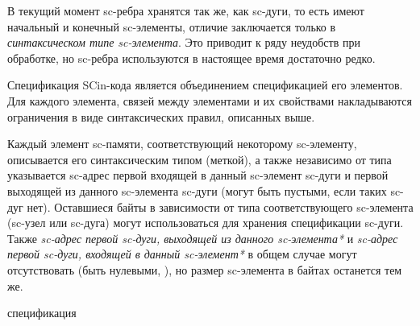 В текущий момент sc-ребра хранятся так же, как sc-дуги, то есть имеют начальный и конечный sc-элементы, отличие заключается только в \textit{синтаксическом типе sc-элемента}. Это приводит к ряду неудобств при обработке, но sc-ребра используются в настоящее время достаточно редко.

Спецификация SCin-кода является объединением спецификацией его элементов. Для каждого элемента, связей между элементами и их свойствами накладываются ограничения в виде синтаксических правил, описанных выше.

\begin{SCn}
\begin{scnindent}
\end{scnindent}
\end{SCn}

Каждый элемент sc-памяти, соответствующий некоторому sc-элементу, описывается его синтаксическим типом (меткой), а также независимо от типа указывается sc-адрес первой входящей в данный sc-элемент sc-дуги и первой выходящей из данного sc-элемента sc-дуги (могут быть пустыми, если таких sc-дуг нет). Оставшиеся байты в зависимости от типа соответствующего sc-элемента (sc-узел или sc-дуга) могут использоваться для хранения спецификации sc-дуги. Также \textit{sc-адрес первой sc-дуги, выходящей из данного sc-элемента*} и \textit{sc-адрес первой sc-дуги, входящей в данный sc-элемент*} в общем случае могут отсутствовать (быть нулевыми, ), но размер sc-элемента в байтах останется тем же.

\begin{SCn}
\begin{scnrelfromset}{спецификация}
\end{scnrelfromset}
\end{SCn}

